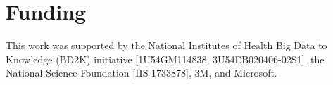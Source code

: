 \section*{Funding}

This work was supported by the National Institutes of Health Big Data to Knowledge (BD2K) initiative [1U54GM114838, 3U54EB020406-02S1], the National Science Foundation [IIS-1733878], 3M, and Microsoft.

\vspace*{-3pt}



%






